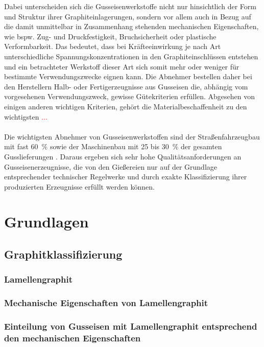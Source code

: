 \documentclass[
fontsize=10pt, 
listof = totoc,
parskip = half	
]{report}
\begin{document}
\noindent Dabei unterscheiden sich die Gusseisenwerkstoffe nicht nur hinsichtlich der Form und Struktur ihrer Graphiteinlagerungen, sondern vor allem auch in Bezug auf die damit unmittelbar in Zusammenhang stehenden mechanischen Eigenschaften, wie bspw. Zug- und Druckfestigkeit, Bruchsicherheit oder plastische Verformbarkeit. Das bedeutet, dass bei Kräfteeinwirkung je nach Art unterschiedliche Spannungskonzentrationen in den Graphiteinschlüssen entstehen und ein betrachteter Werkstoff dieser Art sich somit mehr oder weniger für bestimmte Verwendungszwecke eignen kann. Die Abnehmer bestellen daher bei den Herstellern Halb- oder Fertigerzeugnisse aus Gusseisen die, abhängig vom vorgesehenen Verwendungszweck, gewisse Gütekriterien erfüllen. Abgesehen von einigen anderen wichtigen Kriterien, gehört die Materialbeschaffenheit zu den wichtigsten \textcolor{red}{...}
\\\\
\noindent Die wichtigsten Abnehmer von Gusseisenwerkstoffen sind der Straßenfahrzeugbau mit fast 60~\% sowie der Maschinenbau mit 25 bis 30~\% der gesamten Gusslieferungen \cite{BDGuss01}. Daraus ergeben sich sehr hohe Qualitätsanforderungen an Gusseisenerzeugnisse, die von den Gießereien nur auf der Grundlage entsprechender technischer Regelwerke und durch exakte Klassifizierung ihrer produzierten Erzeugnisse erfüllt werden können. 



\chapter{Grundlagen}
\label{ch:Grundlagen}

\section{Graphitklassifizierung}
\label{sec:Graphitklassifizierung}

\subsection{Lamellengraphit}
\label{subsec:Lamellengraphit}

\subsection{Mechanische Eigenschaften von Lamellengraphit}
\label{subsec:MechanischeEigenschaften}

\subsection{Einteilung von Gusseisen mit Lamellengraphit entsprechend den mechanischen Eigenschaften}
\label{subsec:EinteilungLamellengraphit}
\end{document}
